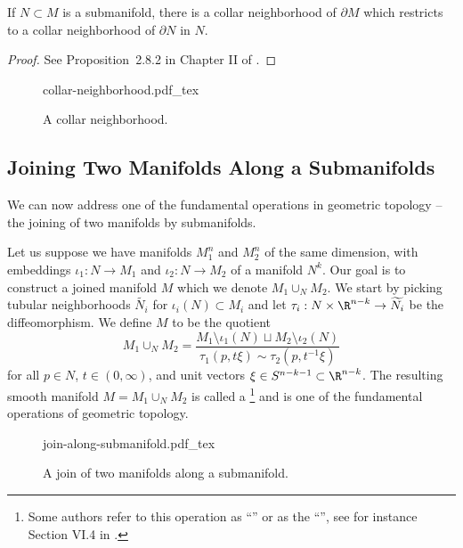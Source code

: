 \begin{proposition}
	If $N\subset M$ is a submanifold, there is a collar neighborhood of $\partial M$ which restricts to a collar neighborhood of $\partial N$ in $N$.
\end{proposition}
\begin{proof}
	See Proposition~2.8.2 in Chapter II of \cite{kosinski1993differential}.
\end{proof}

\begin{figure}[ht]
	\centering
	{collar-neighborhood.pdf_tex}
	\caption{A collar neighborhood.}\label{fig:collar-neighborhoods}
\end{figure}

\subsection{Joining Two Manifolds Along a Submanifolds}

We can now address one of the fundamental operations in geometric topology -- the joining of two manifolds by submanifolds.

Let us suppose we have manifolds $M_1^n$ and $M_2^n$ of the same dimension, with embeddings $\iota_1 : N\to M_1$ and $\iota_2 : N\to M_2$ of a manifold $N^k$. Our goal is to construct a joined manifold $M$ which we denote $M_1\cup_N M_2$.
We start by picking tubular neighborhoods $\widetilde{N_i}$ for $\iota_i(N)\subset M_i$ and let $\tau_i: N\times \R^{n-k} \to \widetilde{N_i}$ be the diffeomorphism.
We define $M$ to be the quotient
\begin{equation}\label{eq:join-definition}
	M_1\cup_N M_2 = \frac{M_1\setminus \iota_1(N)\sqcup M_2\setminus \iota_2(N)}{\tau_1(p, t\xi) \sim \tau_2(p, t^{-1}\xi)}
\end{equation}
for all $p\in N$, $t\in(0,\infty)$, and unit vectors $\xi\in S^{n-k-1}\subset \R^{n-k}$. The resulting smooth manifold $M=M_1\cup_N M_2$ is called a \footnote{Some authors refer to this operation as ``'' or as the ``'', see for instance Section VI.4 in \cite{kosinski1993differential}.} and is one of the fundamental operations of geometric topology.

\begin{figure}[ht]
	\centering
	{join-along-submanifold.pdf_tex}
	\caption{A join of two manifolds along a submanifold.}\label{fig:join-along-submanifold}
\end{figure}

